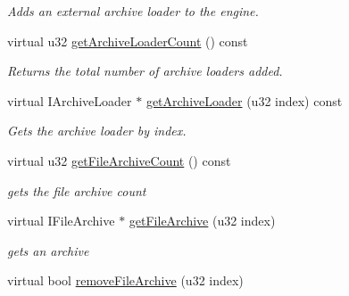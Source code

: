 \begin{DoxyCompactItemize}
\begin{DoxyCompactList}\small\item\em Adds an external archive loader to the engine. \end{DoxyCompactList}\item 
\hypertarget{classirr_1_1io_1_1_c_file_system_adb2a7d59568962e0fcfa889b6b2c1f1f}{virtual u32 \hyperlink{classirr_1_1io_1_1_c_file_system_adb2a7d59568962e0fcfa889b6b2c1f1f}{get\-Archive\-Loader\-Count} () const }\label{classirr_1_1io_1_1_c_file_system_adb2a7d59568962e0fcfa889b6b2c1f1f}

\begin{DoxyCompactList}\small\item\em Returns the total number of archive loaders added. \end{DoxyCompactList}\item 
\hypertarget{classirr_1_1io_1_1_c_file_system_a0aacc3fc4c16fe77346aa402797d1ee1}{virtual I\-Archive\-Loader $\ast$ \hyperlink{classirr_1_1io_1_1_c_file_system_a0aacc3fc4c16fe77346aa402797d1ee1}{get\-Archive\-Loader} (u32 index) const }\label{classirr_1_1io_1_1_c_file_system_a0aacc3fc4c16fe77346aa402797d1ee1}

\begin{DoxyCompactList}\small\item\em Gets the archive loader by index. \end{DoxyCompactList}\item 
virtual u32 \hyperlink{classirr_1_1io_1_1_c_file_system_a446954e1446c0e49c9d50c4c75ecbef9}{get\-File\-Archive\-Count} () const 
\begin{DoxyCompactList}\small\item\em gets the file archive count \end{DoxyCompactList}\item 
\hypertarget{classirr_1_1io_1_1_c_file_system_a95c7d756b675b07115206f68a9effe22}{virtual I\-File\-Archive $\ast$ \hyperlink{classirr_1_1io_1_1_c_file_system_a95c7d756b675b07115206f68a9effe22}{get\-File\-Archive} (u32 index)}\label{classirr_1_1io_1_1_c_file_system_a95c7d756b675b07115206f68a9effe22}

\begin{DoxyCompactList}\small\item\em gets an archive \end{DoxyCompactList}\item 
\hypertarget{classirr_1_1io_1_1_c_file_system_a2870e1d08a60fe51c8185c3031239f68}{virtual bool \hyperlink{classirr_1_1io_1_1_c_file_system_a2870e1d08a60fe51c8185c3031239f68}{remove\-File\-Archive} (u32 index)}\label{classirr_1_1io_1_1_c_file_system_a2870e1d08a60fe51c8185c3031239f68}


\end{DoxyCompactItemize}
